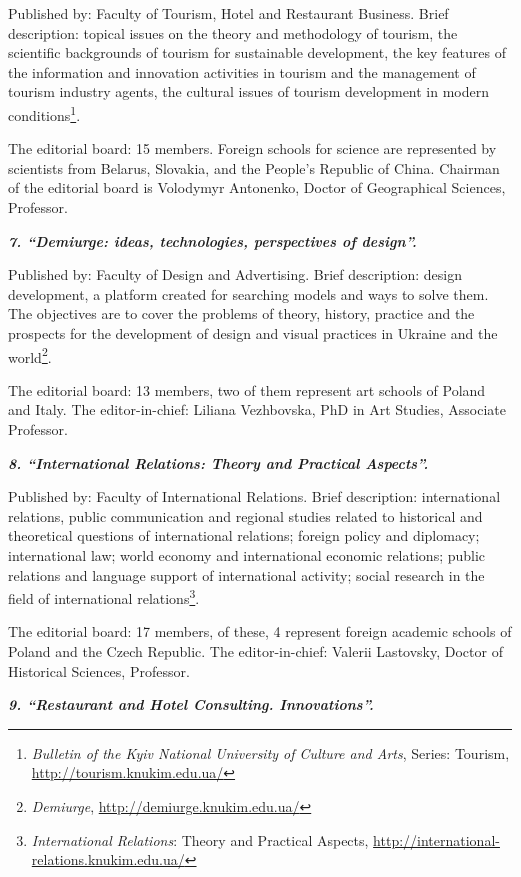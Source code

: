 \documentclass[a4paper,
fontsize=11pt,
oneside,
numbers=noperiodatend,
parskip=half-,
bibliography=totoc,
final
]{scrartcl}
\begin{document}
Published by: Faculty of Tourism, Hotel and Restaurant Business. Brief
description: topical issues on the theory and methodology of tourism,
the scientific backgrounds of tourism for sustainable development, the
key features of the information and innovation activities in tourism and
the management of tourism industry agents, the cultural issues of
tourism development in modern conditions\footnote{\emph{Bulletin of the
  Kyiv National University of Culture and Arts}, Series: Tourism,
  \url{http://tourism.knukim.edu.ua/}}.

The editorial board: 15 members. Foreign schools for science are
represented by scientists from Belarus, Slovakia, and the People's
Republic of China. Chairman of the editorial board is Volodymyr
Antonenko, Doctor of Geographical Sciences, Professor.

\textbf{\emph{7. \enquote{Demiurge: ideas, technologies, perspectives of
design}.}}

Published by: Faculty of Design and Advertising. Brief description:
design development, a platform created for searching models and ways to
solve them. The objectives are to cover the problems of theory, history,
practice and the prospects for the development of design and visual
practices in Ukraine and the world\footnote{\emph{Demiurge},
  \url{http://demiurge.knukim.edu.ua/}}.

The editorial board: 13 members, two of them represent art schools of
Poland and Italy. The editor-in-chief: Liliana Vezhbovska, PhD in Art
Studies, Associate Professor.

\textbf{\emph{8. \enquote{International Relations: Theory and Practical
Aspects}.}}

Published by: Faculty of International Relations. Brief description:
international relations, public communication and regional studies
related to historical and theoretical questions of international
relations; foreign policy and diplomacy; international law; world
economy and international economic relations; public relations and
language support of international activity; social research in the field
of international relations\footnote{\emph{International Relations}:
  Theory and Practical Aspects,
  \url{http://international-relations.knukim.edu.ua/}}.

The editorial board: 17 members, of these, 4 represent foreign academic
schools of Poland and the Czech Republic. The editor-in-chief: Valerii
Lastovsky, Doctor of Historical Sciences, Professor.

\textbf{\emph{9. \enquote{Restaurant and Hotel Consulting.
Innovations}.}}
\end{document}
